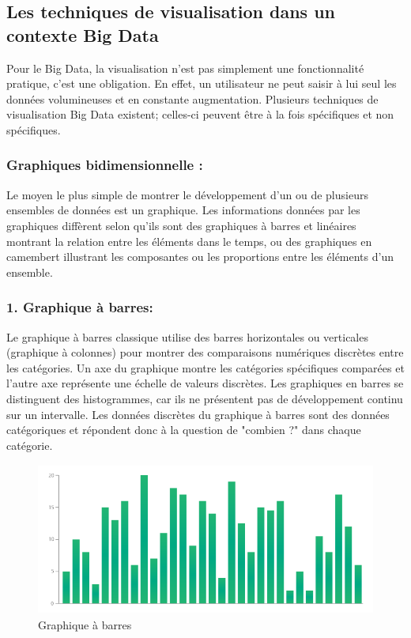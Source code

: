 \documentclass[french, a4paper, 12pt]{report}
\begin{document}
\subsection{Les techniques de visualisation dans un contexte Big Data }
Pour le Big Data, la visualisation n’est pas simplement une fonctionnalité pratique, c’est une obligation. En effet, un utilisateur ne peut saisir à lui seul les données volumineuses et en constante augmentation. Plusieurs techniques de visualisation Big Data existent; celles-ci peuvent être à la fois spécifiques et non spécifiques.
\subsubsection{Graphiques bidimensionnelle :}
Le moyen le plus simple de montrer le développement d'un ou de plusieurs ensembles de données est un graphique. Les informations données par les graphiques diffèrent selon qu’ils sont des graphiques à barres et linéaires montrant la relation entre les éléments dans le temps, ou des graphiques en camembert illustrant les composantes ou les proportions entre les éléments d'un ensemble.
\subsubsection{1. Graphique à barres:}
Le graphique à barres classique utilise des barres horizontales ou verticales (graphique à colonnes) pour montrer des comparaisons numériques discrètes entre les catégories. Un axe du graphique montre les catégories spécifiques comparées et l'autre axe représente une échelle de valeurs discrètes.
Les graphiques en barres se distinguent des histogrammes, car ils ne présentent pas de développement continu sur un intervalle. Les données discrètes du graphique à barres sont des données catégoriques et répondent donc à la question de "combien ?" dans chaque catégorie.

\begin{figure}[!ht]
    \centering
    \includegraphics[height=5cm]{images/bar_chart.png}
    \caption{Graphique à barres}
    \label{fig:2.3}
\end{figure}
\end{document}
